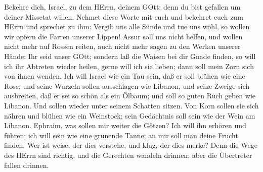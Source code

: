  Bekehre dich, Israel, zu dem HErrn, deinem GOtt; denn du
bist gefallen um deiner Missetat willen.  Nehmet diese Worte
mit euch und bekehret euch zum HErrn und sprechet zu ihm: Vergib uns
alle Sünde und tue uns wohl, so wollen wir opfern die Farren unserer
Lippen!  Assur soll uns nicht helfen, und wollen nicht mehr
auf Rossen reiten, auch nicht mehr sagen zu den Werken unserer Hände:
Ihr seid unser GOtt; sondern laß die Waisen bei dir Gnade finden,
 so will ich ihr Abtreten wieder heilen, gerne will ich sie
lieben; dann soll mein Zorn sich von ihnen wenden.  Ich will
Israel wie ein Tau sein, daß er soll blühen wie eine Rose; und seine
Wurzeln sollen ausschlagen wie Libanon,  und seine Zweige
sich ausbreiten, daß er sei so schön als ein Ölbaum; und soll so guten
Ruch geben wie Libanon.  Und sollen wieder unter seinem
Schatten sitzen. Von Korn sollen sie sich nähren und blühen wie ein
Weinstock; sein Gedächtnis soll sein wie der Wein am Libanon.
 Ephraim, was sollen mir weiter die Götzen? Ich will ihn
erhören und führen; ich will sein wie eine grünende Tanne; an mir soll
man deine Frucht finden.  Wer ist weise, der dies verstehe,
und klug, der dies merke? Denn die Wege des HErrn sind richtig, und die
Gerechten wandeln drinnen; aber die Übertreter fallen drinnen.
